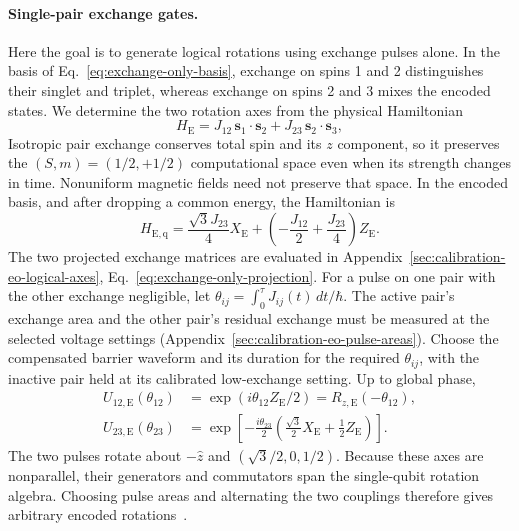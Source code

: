 \paragraph{Single-pair exchange gates.}
Here the goal is to generate logical rotations using exchange pulses
alone. In the basis of Eq.~\eqref{eq:exchange-only-basis}, exchange
on spins 1 and 2 distinguishes their singlet and triplet, whereas
exchange on spins 2 and 3 mixes the encoded states.
We determine the two rotation axes from the physical Hamiltonian
\begin{equation}
  H_{\mathrm E}=J_{12}\,\mathbf{s}_1\cdot\mathbf{s}_2
                  +J_{23}\,\mathbf{s}_2\cdot\mathbf{s}_3,
  \label{eq:exchange-only-control}
\end{equation}
Isotropic pair exchange conserves total spin and its $z$ component,
so it preserves the $(S,m)=(1/2,+1/2)$ computational space even
when its strength changes in time. Nonuniform magnetic fields
need not preserve that space. In the encoded basis, and after
dropping a common energy, the Hamiltonian is
\begin{equation}
 H_{\mathrm{E,q}}
   =\frac{\sqrt3 J_{23}}{4}X_{\mathrm E}
      +\left(-\frac{J_{12}}2+\frac{J_{23}}4\right)Z_{\mathrm E}.
 \label{eq:exchange-only-logical-control}
\end{equation}
The two projected exchange matrices are evaluated in
Appendix~\ref{sec:calibration-eo-logical-axes},
Eq.~\eqref{eq:exchange-only-projection}.
For a pulse on one pair with the other exchange negligible, let
$\theta_{ij}=\int_0^\tau J_{ij}(t)\,dt/\hbar$.
The active pair's exchange area and the other pair's residual
exchange must be measured at the selected voltage settings
(Appendix~\ref{sec:calibration-eo-pulse-areas}). Choose the compensated
barrier waveform and its duration for the required $\theta_{ij}$,
with the inactive pair held at its calibrated low-exchange setting.
Up to global phase,
\begin{equation}
 \begin{aligned}
 U_{12,\mathrm E}(\theta_{12})
    &=\exp(i\theta_{12}Z_{\mathrm E}/2)
      =R_{z,\mathrm E}(-\theta_{12}),\\
 U_{23,\mathrm E}(\theta_{23})
    &=\exp\!\left[-\frac{i\theta_{23}}2
          \left(\frac{\sqrt3}{2}X_{\mathrm E}
                            +\frac12 Z_{\mathrm E}\right)\right].
 \end{aligned}
 \label{eq:exchange-only-rotations}
\end{equation}
The two pulses rotate about $-\hat z$ and $(\sqrt3/2,0,1/2)$.
Because these axes are nonparallel, their generators and commutators
span the single-qubit rotation algebra.
Choosing pulse areas and alternating the two couplings therefore
gives arbitrary encoded rotations~\cite{DiVincenzo2000}.

